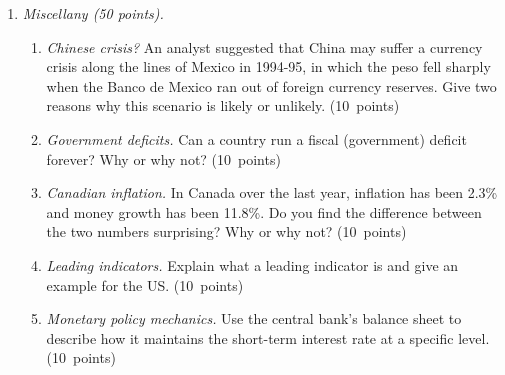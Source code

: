 \documentclass[letterpaper,12pt]{article}
\begin{document}
\begin{enumerate}
\begin{comment}
\end{enumerate}
\end{comment}


\item {\it Miscellany (50 points).}

\begin{enumerate}
\item {\it Chinese crisis?\/}
An analyst suggested that China may suffer a currency crisis
along the lines of Mexico in 1994-95,
in which the peso fell sharply when the Banco de Mexico
ran out of foreign currency reserves.
Give two reasons why this scenario is likely or unlikely.
 (10~points)

\item {\it Government deficits.\/}
Can a country run a fiscal (government) deficit forever?
Why or why not?
 (10~points)


\item {\it Canadian inflation.\/}
In Canada over the last year, inflation has been 2.3\%
and money growth  has been 11.8\%.
Do you find the difference between the two numbers surprising?
Why or why not?  (10~points)

\item {\it Leading indicators.\/}
Explain what a leading indicator is
and give an example for the US.  (10~points)

\item {\it Monetary policy mechanics.\/}
Use the central bank's balance sheet to describe 
how it 
maintains the short-term interest rate at a specific level.
(10~points)

\end{enumerate}
\begin{comment}
Answers.
\begin{enumerate}
\item 
(i)~China has enormous foreign exchange 
reserves:  they won't run out any time soon.
(ii)~The renminbi seems to be undervalued:  
people want to buy it,
not sell it, which results in the central bank accumulating reserves,
not losing them.

\item 
The present value of future primary surpluses has to equal
the current debt.  Thus past deficits must be balanced by future
surpluses --- you can't run a primary deficit forever. The key word
is primary:  you can run a primary surplus and an overall deficit at
the same time, as we see in (for example) Turkey.


\end{comment}
\end{enumerate}
\end{document}
